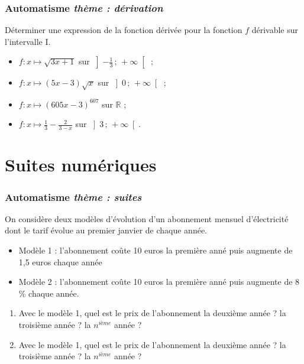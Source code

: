 \documentclass[11pt]{beamer}
\newcommand{\R}{\mathbb{R}}
\newcommand{\Interoo}[2]{\left]#1\, ;\, #2\right[}
\newcounter{autocompteur}
\newcommand{\automatisme}[1]{\addtocounter{autocompteur}{1}\frametitle{Automatisme  \theautocompteur  \textit{ thème : #1}}}
\begin{document}
\begin{frame}
\automatisme{dérivation}

Déterminer une expression de la fonction dérivée pour la fonction $f$ dérivable sur l'intervalle I.
\begin{itemize}
\item $f:x \mapsto \sqrt{3x+1}$ sur $\Interoo{-\frac{1}{3}}{+\infty}$ ;
 \item $f:x \mapsto (5x-3)\sqrt{x}$ sur $\Interoo{0}{+\infty}$ ;
 \item $f:x \mapsto \left(605x-3\right)^{607}$ sur $\R$ ; 
 \item $f:x \mapsto \frac{1}{3}-\frac{2}{3-x}$ sur $\Interoo{3}{+\infty}$.
\end{itemize}

\end{frame}




\section{Suites numériques}

\begin{frame}
\automatisme{suites}
On considère deux modèles d'évolution d'un abonnement mensuel d'électricité dont le tarif évolue au premier janvier de chaque année.
\begin{itemize}
\item Modèle 1 : l'abonnement  coûte 10 euros la première anné puis augmente de 1,5 euros chaque année
\item Modèle 2 : l'abonnement coûte 10 euros la première anné puis augmente de 8 \% chaque année.
\end{itemize}
\begin{enumerate}
\item Avec le modèle 1, quel est le prix de l'abonnement la deuxième année ? la troisième année ? la $n^{ième}$ année ?
\item Avec le modèle 1, quel est le prix de l'abonnement la deuxième année ? la troisième année ? la $n^{ième}$ année ?
\end{enumerate}

\end{frame}
\end{document}
